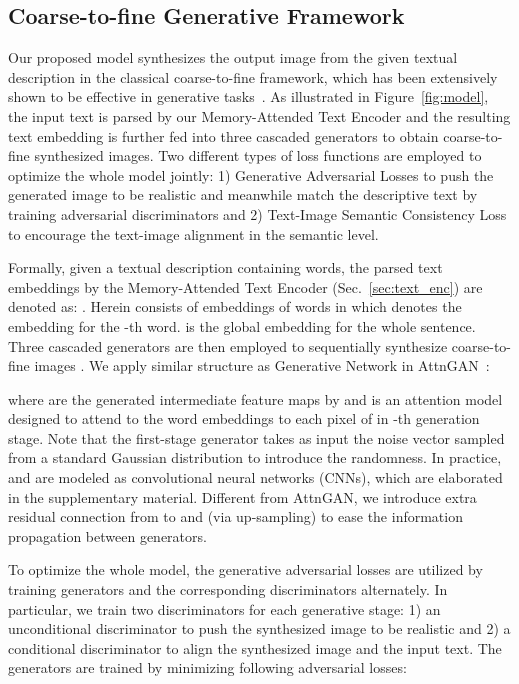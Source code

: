 \documentclass[runningheads]{llncs}
\begin{document}
\subsection{Coarse-to-fine Generative Framework}
\label{sec:generative_framework}
Our proposed model synthesizes the output image from the given textual description in the classical coarse-to-fine framework, which has been extensively shown to be effective in generative tasks~\cite{li2019object,qiao2019mirrorgan,xu2018attngan,yin2019semantics,zhang2017stackgan,Han2017StackGAN}. As illustrated in Figure~\ref{fig:model}, the input text is parsed by our Memory-Attended Text Encoder and the resulting text embedding is further fed into three cascaded generators to obtain coarse-to-fine synthesized images. Two different types of loss functions are employed to optimize the whole model jointly: 1) Generative Adversarial Losses to push the generated image to be realistic and meanwhile match the descriptive text by training adversarial discriminators and 2) Text-Image Semantic Consistency Loss to encourage the text-image alignment in the semantic level. 

\noindent Formally, given a textual description  containing  words, the parsed text embeddings by the Memory-Attended Text Encoder (Sec.~\ref{sec:text_enc}) are denoted as: .
\noindent Herein  consists of embeddings of  words in which  denotes the embedding for the -th word.  is the global embedding for the whole sentence. Three cascaded generators  are then employed to sequentially synthesize coarse-to-fine images . We apply similar structure as Generative Network in AttnGAN~\cite{xu2018attngan}:

\noindent
 where  are the generated intermediate feature maps by  and  is an attention model designed to attend to the word embeddings  to each pixel of  in -th generation stage. Note that the first-stage generator  takes as input the noise vector  sampled from a standard Gaussian distribution to introduce the randomness. In practice,  and  are modeled as convolutional neural networks (CNNs), which are elaborated in the supplementary material. Different from AttnGAN, we introduce extra residual connection from  to  and  (via up-sampling) to ease the information propagation between generators.  

\noindent To optimize the whole model, the generative adversarial losses are utilized
by training generators and the corresponding discriminators alternately.
In particular, we train two discriminators for each generative stage: 1) an unconditional discriminator  to push the synthesized image to be realistic and 2) a conditional discriminator  to align the synthesized image and the input text. 
The generators are trained by minimizing following adversarial losses:
\end{document}
